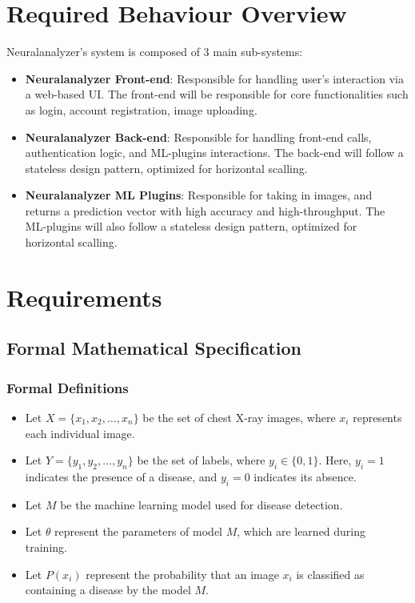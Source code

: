 \documentclass[12pt]{article}
\begin{document}
\section{Required Behaviour Overview}
Neuralanalyzer's system is composed of 3 main sub-systems:
\begin{itemize}
    \item \textbf{Neuralanalyzer Front-end}: Responsible for handling user's interaction via a web-based UI. The front-end will be responsible for core functionalities such as login, account registration, image uploading.
    \item \textbf{Neuralanalyzer Back-end}: Responsible for handling front-end calls, authentication logic, and ML-plugins interactions. The back-end will follow a stateless design pattern, optimized for horizontal scalling.
    \item \textbf{Neuralanalyzer ML Plugins}: Responsible for taking in images, and returns a prediction vector with high accuracy and high-throughput. The ML-plugins will also follow a stateless design pattern, optimized for horizontal scalling.
\end{itemize}

  \clearpage
\section{Requirements}
\subsection{Formal Mathematical Specification}

\subsubsection{Formal Definitions}
\begin{itemize}
  \item Let \( X = \{x_1, x_2, \ldots, x_n\} \) be the set of chest X-ray images, where \( x_i \) represents each individual image.
  \item Let \( Y = \{y_1, y_2, \ldots, y_n\} \) be the set of labels, where \( y_i \in \{0, 1\} \). Here, \( y_i = 1 \) indicates the presence of a disease, and \( y_i = 0 \) indicates its absence.
  \item Let \( M \) be the machine learning model used for disease detection.
  \item Let \( \theta \) represent the parameters of model \( M \), which are learned during training.
  \item Let \( P(x_i) \) represent the probability that an image \( x_i \) is classified as containing a disease by the model \( M \).
\end{itemize}
\end{document}
